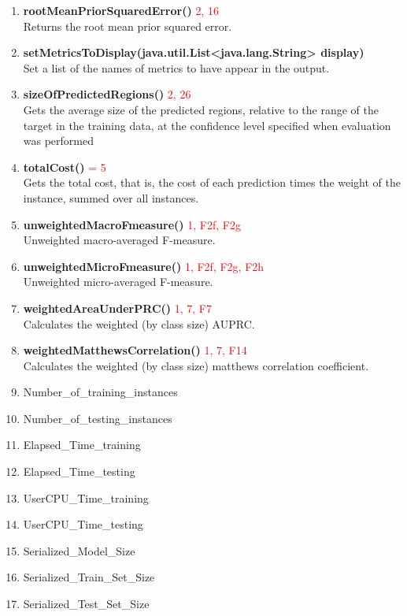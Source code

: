 \documentclass[a4paper,12pt]{article}
\begin{document}
\begin{enumerate}
\item \textbf{rootMeanPriorSquaredError()}  \textcolor{red}{2, 16}
         \\ Returns the root mean prior squared error.          
          
       
\item \textbf{setMetricsToDisplay(java.util.List<java.lang.String> display)}
       \\   Set a list of the names of metrics to have appear in the output.          
             
\item \textbf{sizeOfPredictedRegions()} \textcolor{red}{2, 26}
        \\  Gets the average size of the predicted regions, relative to the range of the target in the training data, at the confidence level specified when evaluation was performed

\item \textbf{totalCost()} \textcolor{red}{ = 5}
         \\ Gets the total cost, that is, the cost of each prediction times the weight of the instance, summed over all instances.                   

\item \textbf{unweightedMacroFmeasure()} \textcolor{red}{1, F2f, F2g}
        \\  Unweighted macro-averaged F-measure.
          
\item \textbf{unweightedMicroFmeasure()} \textcolor{red}{1, F2f, F2g, F2h}
        \\  Unweighted micro-averaged F-measure.          

\item \textbf{weightedAreaUnderPRC()} \textcolor{red}{1, 7, F7}
        \\  Calculates the weighted (by class size) AUPRC.


          
\item \textbf{weightedMatthewsCorrelation()} \textcolor{red}{1, 7, F14}
          \\Calculates the weighted (by class size) matthews correlation coefficient.
          
\item Number\_of\_training\_instances

\item Number\_of\_testing\_instances          

\item Elapsed\_Time\_training

\item Elapsed\_Time\_testing

\item UserCPU\_Time\_training

\item UserCPU\_Time\_testing
    
\item Serialized\_Model\_Size

\item Serialized\_Train\_Set\_Size

\item Serialized\_Test\_Set\_Size
	    
\end{enumerate}
\end{document}
